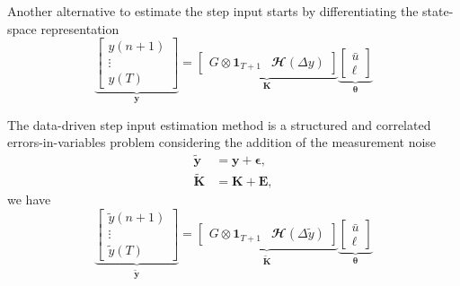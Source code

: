 \documentclass[presentation]{beamer}
\begin{document}
\begin{frame}[label={slide:preliminaries6}]{Another alternative to estimate the step input \linebreak starts by differentiating the state-space representation}
\begin{equation*} \underbrace{ \begin{bmatrix} y(n+1) \\ \vdots \\ y(T) \end{bmatrix}}_{\mathbf{y}} = \underbrace{ \begin{bmatrix} G \otimes \mathbf{1}_{T+1} & \mathbfcal{H}\left(\Delta {y}\right) \end{bmatrix}}_{\mathbf{K}} \underbrace{ \begin{bmatrix} \bar{{u}} \\ \bm{\ell} \end{bmatrix} }_{\bm{\theta}} \end{equation*}
\end{frame}

\begin{frame}[label={slide:preliminaries7}]{The data-driven step input estimation method is a structured and correlated errors-in-variables problem}
considering the addition of the measurement noise
\begin{equation*} \begin{aligned} \widetilde{\mathbf{y}} &= \mathbf{y} + \bm{\epsilon} , \\
\widetilde{\mathbf{K}} &= \mathbf{K} + \mathbf{E} , \end{aligned} \end{equation*}
we have
\begin{equation*} \underbrace{ \begin{bmatrix} \widetilde{y}(n+1) \\ \vdots \\ \widetilde{y}(T) \end{bmatrix}}_{\widetilde{\mathbf{y}}} = \underbrace{ \begin{bmatrix} G \otimes \mathbf{1}_{T+1} & \mathbfcal{H}\left(\Delta {\widetilde{y}}\right) \end{bmatrix}}_{\widetilde{\mathbf{K}}} \underbrace{ \begin{bmatrix} \bar{{u}} \\ \bm{\ell} \end{bmatrix} }_{\bm{\theta}} \end{equation*}
\end{frame}
\end{document}
